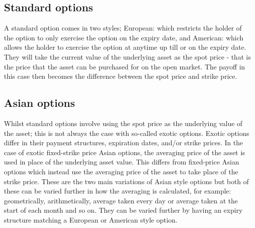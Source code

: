 

\subsection{Standard options}

A standard option comes in two styles; European: which restricts the holder of the option to only exercise the option on the expiry date, and American: which allows the holder to exercise the option at anytime up till or on the expiry date. They will take the current value of the underlying asset as the spot price - that is the price that the asset can be purchased for on the open market. The payoff in this case then becomes the difference between the spot price and strike price.

\subsection{Asian options}

Whilst standard options involve using the spot price as the underlying value of the asset; this is not always the case with so-called exotic options. Exotic options differ in their payment structures, expiration dates, and/or strike prices. In the case of exotic fixed-strike price Asian options, the averaging price of the asset is used in place of the underlying asset value. This differs from fixed-price Asian options which instead use the averaging price of the asset to take place of the strike price. These are the two main variations of Asian style options but both of these can be varied further in how the averaging is calculated, for example: geometrically, arithmetically, average taken every day or average taken at the start of each month and so on. They can be varied further by having an expiry structure matching a European or American style option.

